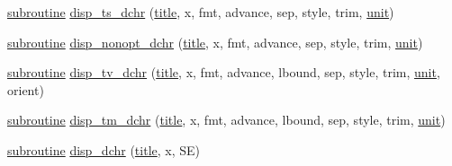 \begin{DoxyCompactItemize}
\hyperlink{M__stopwatch_83_8txt_acfbcff50169d691ff02d4a123ed70482}{subroutine} \hyperlink{namespacem__display_a337ce942da78737d24272e0c0cf55fbb}{disp\+\_\+ts\+\_\+dchr} (\hyperlink{print__watch_83_8txt_a15b5bd21156bb9fca6a755ab8c029a9c}{title}, x, fmt, advance, sep, style, trim, \hyperlink{M__stopwatch_83_8txt_a5cbef30eb7c0d734bd82f5a7ebea9aa7}{unit})
\item 
\hyperlink{M__stopwatch_83_8txt_acfbcff50169d691ff02d4a123ed70482}{subroutine} \hyperlink{namespacem__display_a12b5831082d636bdab23dbc7c1ddb879}{disp\+\_\+nonopt\+\_\+dchr} (\hyperlink{print__watch_83_8txt_a15b5bd21156bb9fca6a755ab8c029a9c}{title}, x, fmt, advance, sep, style, trim, \hyperlink{M__stopwatch_83_8txt_a5cbef30eb7c0d734bd82f5a7ebea9aa7}{unit})
\item 
\hyperlink{M__stopwatch_83_8txt_acfbcff50169d691ff02d4a123ed70482}{subroutine} \hyperlink{namespacem__display_a72a748a2cf5f7d1fd96d5634a2daa11f}{disp\+\_\+tv\+\_\+dchr} (\hyperlink{print__watch_83_8txt_a15b5bd21156bb9fca6a755ab8c029a9c}{title}, x, fmt, advance, lbound, sep, style, trim, \hyperlink{M__stopwatch_83_8txt_a5cbef30eb7c0d734bd82f5a7ebea9aa7}{unit}, orient)
\item 
\hyperlink{M__stopwatch_83_8txt_acfbcff50169d691ff02d4a123ed70482}{subroutine} \hyperlink{namespacem__display_a617f15809ebffb2f8182db80523dd291}{disp\+\_\+tm\+\_\+dchr} (\hyperlink{print__watch_83_8txt_a15b5bd21156bb9fca6a755ab8c029a9c}{title}, x, fmt, advance, lbound, sep, style, trim, \hyperlink{M__stopwatch_83_8txt_a5cbef30eb7c0d734bd82f5a7ebea9aa7}{unit})
\item 
\hyperlink{M__stopwatch_83_8txt_acfbcff50169d691ff02d4a123ed70482}{subroutine} \hyperlink{namespacem__display_a41b95f416778be093db3be49b2334570}{disp\+\_\+dchr} (\hyperlink{print__watch_83_8txt_a15b5bd21156bb9fca6a755ab8c029a9c}{title}, x, SE)
\end{DoxyCompactItemize}
